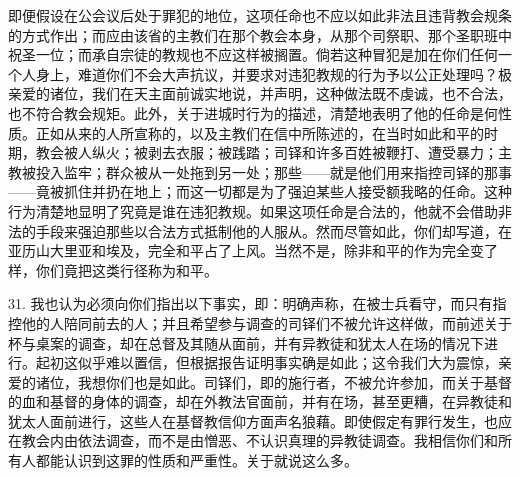 即便假设在公会议后处于罪犯的地位，这项任命也不应以如此非法且违背教会规条的方式作出；而应由该省的主教们在那个教会本身，从那个司祭职、那个圣职班中祝圣一位；而承自宗徒的教规也不应这样被搁置。倘若这种冒犯是加在你们任何一个人身上，难道你们不会大声抗议，并要求对违犯教规的行为予以公正处理吗？极亲爱的诸位，我们在天主面前诚实地说，并声明，这种做法既不虔诚，也不合法，也不符合教会规矩。此外，关于进城时行为的描述，清楚地表明了他的任命是何性质。正如从来的人所宣称的，以及主教们在信中所陈述的，在当时如此和平的时期，教会被人纵火；被剥去衣服；被践踏；司铎和许多百姓被鞭打、遭受暴力；主教被投入监牢；群众被从一处拖到另一处；那些——就是他们用来指控司铎的那事——竟被抓住并扔在地上；而这一切都是为了强迫某些人接受额我略的任命。这种行为清楚地显明了究竟是谁在违犯教规。如果这项任命是合法的，他就不会借助非法的手段来强迫那些以合法方式抵制他的人服从。然而尽管如此，你们却写道，在亚历山大里亚和埃及，完全和平占了上风。当然不是，除非和平的作为完全变了样，你们竟把这类行径称为和平。\par

31. 我也认为必须向你们指出以下事实，即：明确声称，在被士兵看守，而只有指控他的人陪同前去的人；并且希望参与调查的司铎们不被允许这样做，而前述关于杯与桌案的调查，却在总督及其随从面前，并有异教徒和犹太人在场的情况下进行。起初这似乎难以置信，但根据报告证明事实确是如此；这令我们大为震惊，亲爱的诸位，我想你们也是如此。司铎们，即的施行者，不被允许参加，而关于基督的血和基督的身体的调查，却在外教法官面前，并有在场，甚至更糟，在异教徒和犹太人面前进行，这些人在基督教信仰方面声名狼藉。即使假定有罪行发生，也应在教会内由依法调查，而不是由憎恶、不认识真理的异教徒调查。我相信你们和所有人都能认识到这罪的性质和严重性。关于就说这么多。\par

